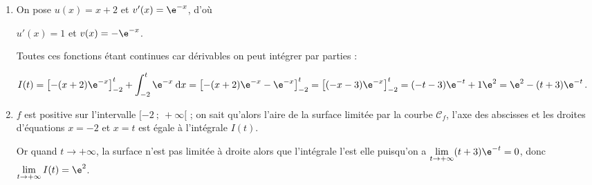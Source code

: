 \begin{enumerate}
	\begin{enumerate}
		\item 
On pose $u(x) = x + 2$ et $v'(x) = \e^{-x}$, d'où	

$u'(x) = 1$ et $v(x) = - \e^{-x}$.

Toutes ces fonctions étant continues car dérivables on peut intégrer par parties :

$I(t) = \left[-(x + 2)\e^{-x} \right]_{-2}^t + \displaystyle\int_{-2}^t \e^{-x}\:\text{d}x = \left[-(x + 2)\e^{-x}- \e^{-x}\right]_{-2}^t = \left[(- x - 3) \e^{-x} \right]_{-2}^t = (- t - 3) \e^{-t} +1 \e^{2} = \e^{2} - (t + 3)\e^{-t}$.


		\item 
$f$ est positive sur l'intervalle $[-2~;~+ \infty[$ ; on sait qu'alors l'aire de la surface limitée par la courbe $\mathcal{C}_f$, l'axe des abscisses et les droites d'équations $x = - 2$ et $x = t$ est égale à l'intégrale $I(t)$.

Or quand $t \to + \infty$, la surface n'est pas limitée à droite alors que l'intégrale l'est elle puisqu'on a $\displaystyle\lim_{t \to + \infty} (t + 3)\e^{- t} = 0$, donc $\displaystyle\lim_{t \to + \infty} I(t) = \e^2$.
	\end{enumerate}
\end{enumerate}
